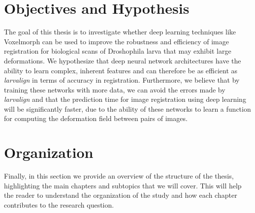 \documentclass{book}
\begin{document}
	\section{Objectives and Hypothesis}
	The goal of this thesis is to investigate whether deep learning techniques like Voxelmorph \cite{Balakrishnan_2019} can be used to improve the robustness and efficiency of image registration for biological scans of Droshophila larva that may exhibit large deformations. We hypothesize that deep neural network architectures have the ability to learn complex, inherent features and can therefore be as efficient as \textit{larvalign} \cite{larvalign} in terms of accuracy in registration. Furthermore, we believe that by training these networks with more data, we can avoid the errors made by \textit{larvalign} \cite{larvalign} and that the prediction time for image registration using deep learning will be significantly faster, due to the ability of these networks to learn a function for computing the deformation field between pairs of images.

	\section{Organization}
	Finally, in this section we provide an overview of the structure of the thesis, highlighting the main chapters and subtopics that we will cover. This will help the reader to understand the organization of the study and how each chapter contributes to the research question.
	
\end{document}
